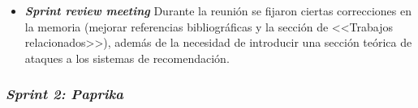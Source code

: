 \begin{itemize}
	Como se puede comprobar, no todos los objetivos marcados fueron cumplidos: la estimación del tiempo fue demasiado optimista, además de no contar con el tiempo requerido en solucionar problemas técnicos (\LaTeX{}). Se dejó para próximos sprints la lectura del último paper.

	\item \textbf{\textit{Sprint review meeting}}
	Durante la reunión se fijaron ciertas correcciones en la memoria (mejorar referencias bibliográficas y la sección de <<Trabajos relacionados>>), además de la necesidad de introducir una sección teórica de ataques a los sistemas de recomendación.
	
\end{itemize}


\subsubsection{\textit{Sprint 2: Paprika}}
